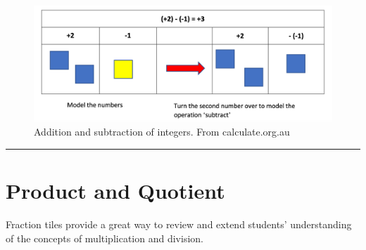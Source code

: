 \documentclass[
  letterpaper,
  DIV=11,
  numbers=noendperiod]{scrartcl}
\begin{document}
\begin{figure}[H]

{\centering \includegraphics{../img/mod03/algebra-tile-3.png}

}

\caption{Addition and subtraction of integers. From calculate.org.au}

\end{figure}%

\begin{center}\rule{0.5\linewidth}{0.5pt}\end{center}

\section{Product and Quotient}\label{product-and-quotient}

Fraction tiles provide a great way to review and extend students'
understanding of the concepts of multiplication and division.
\end{document}
